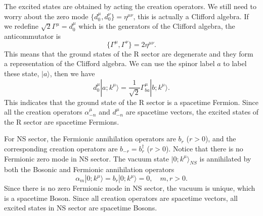 \documentclass[graybox,envcountchap,sectrefs]{svmono}
\begin{document}
The excited states are obtained by acting the creation operators.
We still need to worry about the zero mode 
$\{d^{\mu}_0,d_0^{\nu}\}=\eta^{\mu\nu}$, this is actually a Clifford algebra. If we redefine $\sqrt{2}\Gamma^{\mu}=d_0^{\mu}$ which is the generators of the Clifford algebra, the anticommutator is
\begin{equation}
\{\Gamma^{\mu},\Gamma^{\nu}\}=2\eta^{\mu\nu}.
\end{equation}
This means that the ground states of the R sector are degenerate and they form a representation of the Clifford algebra. We can use the spinor label $a$ to label these state, $|a\rangle$, then we have
\begin{equation}
d_0^{\mu}|a;k^{\mu}\rangle = \frac{1}{\sqrt{2}}\Gamma^{\mu}_{ba}|b;k^{\mu}\rangle.
\end{equation}
 This indicates that the ground state of the R sector is a spacetime Fermion.
Since all the creation operators $\alpha_{-n}^{\mu}$ and $d_{-n}^{\mu}$ are spacetime vectors, the excited states of the R sector are spacetime Fermions.


For NS sector, the Fermionic annihilation operators are  $b_r$ ($r>0$), and the corresponding creation operators are $b_{-r}=b_r^{\dagger}$ ($r>0$).
Notice that there is no Fermionic zero mode in NS sector.
The vacuum state $|0;k^{\mu}\rangle_{NS}$ is annihilated by both the Bosonic and Fermionic annihilation operators
\begin{equation}
\alpha_m|0;k^{\mu}\rangle=b_r|0;k^{\mu}\rangle=0,\quad m,r>0	.
\end{equation}
Since there is no zero Fermionic mode in NS sector, the vacuum is unique, which is a spacetime Boson. Since all creation operators are spacetime vectors, all excited states in NS sector are spacetime Bosons. 
\end{document}
